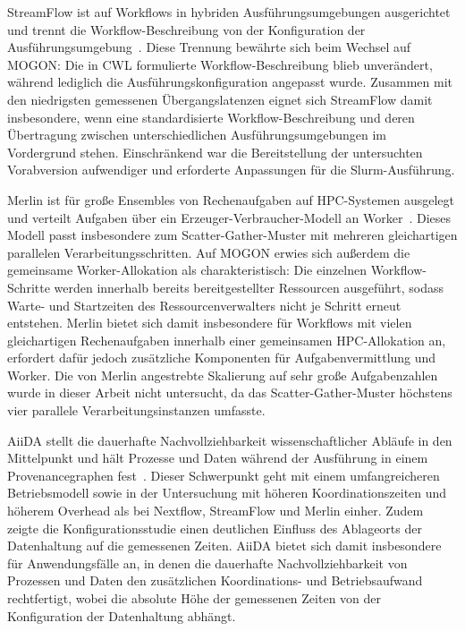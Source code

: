 StreamFlow ist auf Workflows in hybriden Ausführungsumgebungen
ausgerichtet und trennt die Workflow-Beschreibung von der
Konfiguration der
Ausführungsumgebung~\cite{colonnelli2021streamflow}. Diese Trennung
bewährte sich beim Wechsel auf MOGON: Die in CWL formulierte
Workflow-Beschreibung blieb unverändert, während lediglich die
Ausführungskonfiguration angepasst wurde. Zusammen mit den
niedrigsten gemessenen Übergangslatenzen eignet sich StreamFlow
damit insbesondere, wenn eine standardisierte Workflow-Beschreibung
und deren Übertragung zwischen unterschiedlichen
Ausführungsumgebungen im Vordergrund stehen. Einschränkend war die
Bereitstellung der untersuchten Vorabversion aufwendiger und
erforderte Anpassungen für die Slurm-Ausführung.

Merlin ist für große Ensembles von Rechenaufgaben auf HPC-Systemen
ausgelegt und verteilt Aufgaben über ein
Erzeuger-Verbraucher-Modell an
Worker~\cite{peterson2022merlin}. Dieses Modell passt insbesondere
zum Scatter-Gather-Muster mit mehreren gleichartigen parallelen
Verarbeitungsschritten. Auf MOGON erwies sich außerdem die
gemeinsame Worker-Allokation als charakteristisch: Die einzelnen
Workflow-Schritte werden innerhalb bereits bereitgestellter
Ressourcen ausgeführt, sodass Warte- und Startzeiten des
Ressourcenverwalters nicht je Schritt erneut entstehen. Merlin
bietet sich damit insbesondere für Workflows mit vielen
gleichartigen Rechenaufgaben innerhalb einer gemeinsamen
HPC-Allokation an, erfordert dafür jedoch zusätzliche Komponenten
für Aufgabenvermittlung und Worker. Die von Merlin angestrebte
Skalierung auf sehr große Aufgabenzahlen wurde in dieser Arbeit
nicht untersucht, da das Scatter-Gather-Muster höchstens vier
parallele Verarbeitungsinstanzen umfasste.

AiiDA stellt die dauerhafte Nachvollziehbarkeit wissenschaftlicher
Abläufe in den Mittelpunkt und hält Prozesse und Daten während der
Ausführung in einem Provenancegraphen
fest~\cite{huber2020aiida}. Dieser Schwerpunkt geht mit einem
umfangreicheren Betriebsmodell sowie in der Untersuchung mit
höheren Koordinationszeiten und höherem Overhead als bei Nextflow,
StreamFlow und Merlin einher. Zudem zeigte die Konfigurationsstudie
einen deutlichen Einfluss des Ablageorts der Datenhaltung auf die
gemessenen Zeiten. AiiDA bietet sich damit insbesondere für
Anwendungsfälle an, in denen die dauerhafte Nachvollziehbarkeit von
Prozessen und Daten den zusätzlichen Koordinations- und
Betriebsaufwand rechtfertigt, wobei die absolute Höhe der
gemessenen Zeiten von der Konfiguration der Datenhaltung abhängt.

